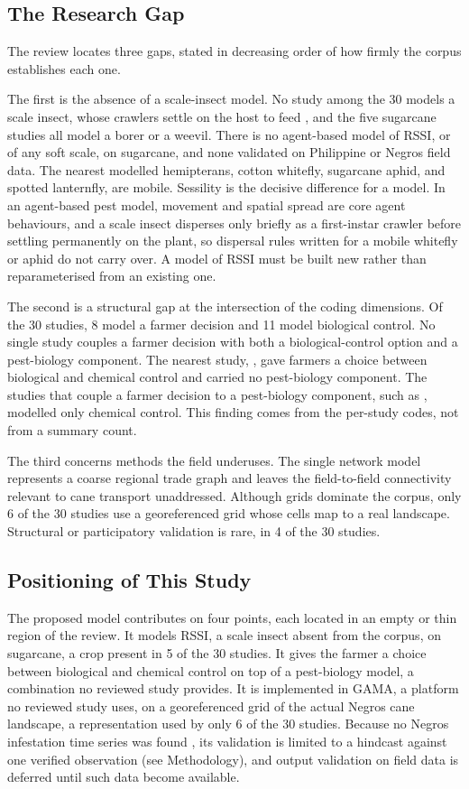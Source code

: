 \subsection{The Research Gap}

The review locates three gaps, stated in decreasing order of how firmly the corpus establishes each one.

The first is the absence of a scale-insect model. No study among the 30 models a scale insect, whose crawlers settle on the host to feed \citep{Guerrero2026}, and the five sugarcane studies all model a borer or a weevil. There is no agent-based model of RSSI, or of any soft scale, on sugarcane, and none validated on Philippine or Negros field data. The nearest modelled hemipterans, cotton whitefly, sugarcane aphid, and spotted lanternfly, are mobile. Sessility is the decisive difference for a model. In an agent-based pest model, movement and spatial spread are core agent behaviours, and a scale insect disperses only briefly as a first-instar crawler before settling permanently on the plant, so dispersal rules written for a mobile whitefly or aphid do not carry over. A model of RSSI must be built new rather than reparameterised from an existing one.

The second is a structural gap at the intersection of the coding dimensions. Of the 30 studies, 8 model a farmer decision and 11 model biological control. No single study couples a farmer decision with both a biological-control option and a pest-biology component. The nearest study, \citet{Chen2024}, gave farmers a choice between biological and chemical control and carried no pest-biology component. The studies that couple a farmer decision to a pest-biology component, such as \citet{Grovermann2017}, modelled only chemical control. This finding comes from the per-study codes, not from a summary count.

The third concerns methods the field underuses. The single network model represents a coarse regional trade graph and leaves the field-to-field connectivity relevant to cane transport unaddressed. Although grids dominate the corpus, only 6 of the 30 studies use a georeferenced grid whose cells map to a real landscape. Structural or participatory validation is rare, in 4 of the 30 studies.

\subsection{Positioning of This Study}

The proposed model contributes on four points, each located in an empty or thin region of the review. It models RSSI, a scale insect absent from the corpus, on sugarcane, a crop present in 5 of the 30 studies. It gives the farmer a choice between biological and chemical control on top of a pest-biology model, a combination no reviewed study provides. It is implemented in GAMA, a platform no reviewed study uses, on a georeferenced grid of the actual Negros cane landscape, a representation used by only 6 of the 30 studies. Because no Negros infestation time series was found \citep{SRA2026FOI,PGNO2026}, its validation is limited to a hindcast against one verified observation (see Methodology), and output validation on field data is deferred until such data become available.
